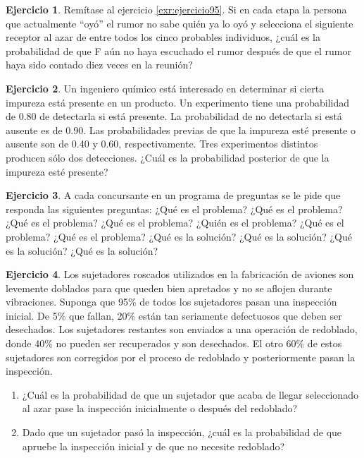 \documentclass[
  11pt,
]{book}
\theoremstyle{definition}
\theoremstyle{definition}
\theoremstyle{definition}
\newtheorem{exercise}{Ejercicio}[chapter]
\theoremstyle{definition}
\theoremstyle{remark}
\begin{document}
\begin{exercise}
Remítase al ejercicio \ref{exr:ejercicio95}. Si en cada etapa la persona que actualmente ``oyó'' el rumor no sabe quién ya lo oyó y selecciona el siguiente receptor al azar de entre todos los cinco probables individuos, ¿cuál es la probabilidad de que F aún no haya escuchado el rumor después de que el rumor haya sido contado diez veces en la reunión?
\end{exercise}

\begin{exercise}
Un ingeniero químico está interesado en determinar si cierta impureza está presente en un producto. Un experimento tiene una probabilidad de 0.80 de detectarla si está presente. La probabilidad de no detectarla si está ausente es de 0.90. Las probabilidades previas de que la impureza esté presente o ausente son de 0.40 y 0.60, respectivamente. Tres experimentos distintos producen sólo dos detecciones. ¿Cuál es la probabilidad posterior de que la impureza esté presente?
\end{exercise}

\begin{exercise}
A cada concursante en un programa de preguntas se le pide que responda las siguientes preguntas: ¿Qué es el problema? ¿Qué es el problema? ¿Qué es el problema? ¿Qué es el problema? ¿Quién es el problema? ¿Qué es el problema? ¿Qué es el problema? ¿Qué es la solución? ¿Qué es la solución? ¿Qué es la solución? ¿Qué es la solución?
\end{exercise}

\begin{exercise}

Los sujetadores roscados utilizados en la fabricación de aviones son levemente doblados para que queden bien apretados y no se aflojen durante vibraciones. Suponga que 95\% de todos los sujetadores pasan una inspección inicial. De 5\% que fallan, 20\% están tan seriamente defectuosos que deben ser desechados. Los sujetadores restantes son enviados a una operación de redoblado, donde 40\% no pueden ser recuperados y son desechados. El otro 60\% de estos sujetadores son corregidos por el proceso de redoblado y posteriormente pasan la inspección.

\begin{enumerate}
\def\labelenumi{\alph{enumi}.}
\item
  ¿Cuál es la probabilidad de que un sujetador que acaba de llegar seleccionado al azar pase la inspección inicialmente o después del redoblado?
\item
  Dado que un sujetador pasó la inspección, ¿cuál es la probabilidad de que apruebe la inspección inicial y de que no necesite redoblado?
\end{enumerate}

\end{exercise}
\end{document}
